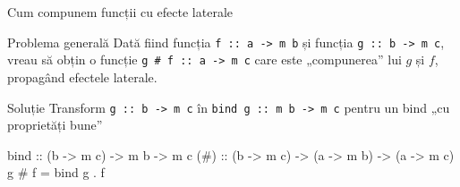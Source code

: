 \documentclass[xcolor=pdftex,romanian,colorlinks]{beamer}
\begin{document}
\begin{frame}[fragile]{Cum compunem funcții cu efecte laterale}
\begin{block}{Problema generală}
Dată fiind funcția \lstinline$f :: a -> m b$ și funcția  \lstinline$g :: b -> m c$, vreau să obțin o funcție \lstinline$g # f :: a -> m c$ care este „compunerea” lui $g$ și $f$, propagând efectele laterale.
\end{block}

\begin{block}{Soluție}
Transform \lstinline$g :: b -> m c$ în \lstinline$bind g :: m b -> m c$ pentru un bind „cu proprietăți bune”
\begin{asciihs}
bind :: (b -> m c) -> m b -> m c
(#) :: (b -> m c) -> (a -> m b) -> (a -> m c)
g # f = bind g . f
\end{asciihs}
\end{block}
\end{frame}
\end{document}
